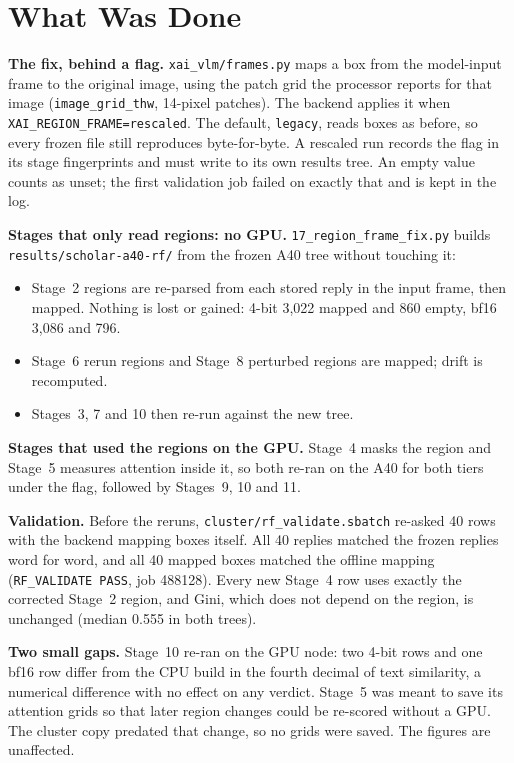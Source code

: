 \section{What Was Done}

\textbf{The fix, behind a flag.} \texttt{xai\_vlm/frames.py} maps a box from the model-input frame to the
original image, using the patch grid the processor reports for that image (\texttt{image\_grid\_thw},
14-pixel patches). The backend applies it when \texttt{XAI\_REGION\_FRAME=rescaled}. The default,
\texttt{legacy}, reads boxes as before, so every frozen file still reproduces byte-for-byte. A rescaled
run records the flag in its stage fingerprints and must write to its own results tree. An empty value
counts as unset; the first validation job failed on exactly that and is kept in the log.

\textbf{Stages that only read regions: no GPU.} \texttt{17\_region\_frame\_fix.py} builds
\texttt{results/scholar-a40-rf/} from the frozen A40 tree without touching it:
\begin{itemize}
\item Stage~2 regions are re-parsed from each stored reply in the input frame, then mapped. Nothing is
lost or gained: 4-bit 3,022 mapped and 860 empty, bf16 3,086 and 796.
\item Stage~6 rerun regions and Stage~8 perturbed regions are mapped; drift is recomputed.
\item Stages~3, 7 and 10 then re-run against the new tree.
\end{itemize}

\textbf{Stages that used the regions on the GPU.} Stage~4 masks the region and Stage~5 measures attention
inside it, so both re-ran on the A40 for both tiers under the flag, followed by Stages~9, 10 and 11.

\textbf{Validation.} Before the reruns, \texttt{cluster/rf\_validate.sbatch} re-asked 40 rows with the
backend mapping boxes itself. All 40 replies matched the frozen replies word for word, and all 40 mapped
boxes matched the offline mapping (\texttt{RF\_VALIDATE PASS}, job 488128). Every new Stage~4 row uses
exactly the corrected Stage~2 region, and Gini, which does not depend on the region, is unchanged
(median 0.555 in both trees).

\textbf{Two small gaps.} Stage~10 re-ran on the GPU node: two 4-bit rows and one bf16 row differ from the
CPU build in the fourth decimal of text similarity, a numerical difference with no effect on any verdict.
Stage~5 was meant to save its attention grids so that later region changes could be re-scored without a
GPU. The cluster copy predated that change, so no grids were saved. The figures are unaffected.

